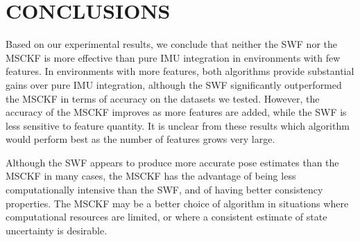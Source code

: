 \documentclass[letterpaper, 10 pt, conference]{ieeeconf}  %
\begin{document}
\section{CONCLUSIONS} \label{sec:conclusions}
Based on our experimental results, we conclude that neither the SWF nor the MSCKF is more effective than pure IMU integration in environments with few features.
In environments with more features, both algorithms provide substantial gains over pure IMU integration, although the SWF significantly outperformed the MSCKF in terms of accuracy on the datasets we tested.
However, the accuracy of the MSCKF improves as more features are added, while the SWF is less sensitive to feature quantity.
It is unclear from these results which algorithm would perform best as the number of features grows very large.

Although the SWF appears to produce more accurate pose estimates than the MSCKF in many cases, the MSCKF has the advantage of being less computationally intensive than the SWF, and of having better consistency properties.
The MSCKF may be a better choice of algorithm in situations where computational resources are limited, or where a consistent estimate of state uncertainty is desirable.



\def\url#1{} %


\end{document}
